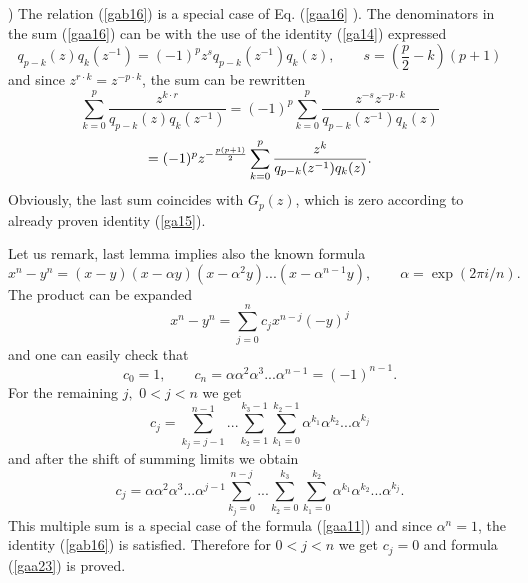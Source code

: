 \documentclass[a4paper,a4paper]{article}
\begin{document}
) The relation (\ref{gab16}) is a special case of Eq. (\ref{gaa16}%
). The denominators in the sum (\ref{gaa16}) can be with the use of the
identity (\ref{ga14}) expressed%
\begin{equation*}
q_{p-k}(z)q_{k}(z^{-1})=(-1)^{p}z^{s}q_{p-k}(z^{-1})q_{k}(z),\qquad s=\left( 
\frac{p}{2}-k\right) (p+1)
\end{equation*}%
and since $z^{r\cdot k}=z^{-p\cdot k}$, the sum can be rewritten%
\begin{equation*}
\sum_{k=0}^{p}\frac{z^{k\cdot r}}{q_{p-k}(z)q_{k}(z^{-1})}%
=(-1)^{p}\sum_{k=0}^{p}\frac{z^{-s}z^{-p\cdot k}}{q_{p-k}(z^{-1})q_{k}(z)}
\end{equation*}%
\begin{equation*}
=(-1)^{p}z^{-\frac{p(p+1)}{2}}\sum_{k=0}^{p}\frac{z^{k}}{%
q_{p-k}(z^{-1})q_{k}(z)}.
\end{equation*}%
Obviously, the last sum coincides with $G_{p}(z)$, which is zero according
to already proven identity (\ref{ga15}).

Let us remark, last lemma implies also the known formula 
\begin{equation}
x^{n}-y^{n}=(x-y)(x-\alpha y)(x-\alpha ^{2}y)...(x-\alpha ^{n-1}y),\qquad
\alpha =\exp (2\pi i/n).  \label{gaa23}
\end{equation}%
The product can be expanded%
\begin{equation*}
x^{n}-y^{n}=\sum_{j=0}^{n}c_{j}x^{n-j}(-y)^{j}
\end{equation*}%
and one can easily check that%
\begin{equation*}
c_{0}=1,\qquad c_{n}=\alpha \alpha ^{2}\alpha ^{3}...\alpha
^{n-1}=(-1)^{n-1}.
\end{equation*}%
For the remaining $j,$ $0<j<n$ we get%
\begin{equation*}
c_{j}=\sum_{k_{j}=j-1}^{n-1}...\sum_{k_{2}=1}^{k_{3}-1}%
\sum_{k_{1}=0}^{k_{2}-1}\alpha ^{k_{1}}\alpha ^{k_{2}}...\alpha ^{k_{j}}
\end{equation*}%
and after the shift of summing limits we obtain%
\begin{equation*}
c_{j}=\alpha \alpha ^{2}\alpha ^{3}...\alpha
^{j-1}\sum_{k_{j}=0}^{n-j}...\sum_{k_{2}=0}^{k_{3}}\sum_{k_{1}=0}^{k_{2}}%
\alpha ^{k_{1}}\alpha ^{k_{2}}...\alpha ^{k_{j}}.
\end{equation*}%
This multiple sum is a special case of the formula (\ref{gaa11}) and since $%
\alpha ^{n}=1$, the identity (\ref{gab16}) is satisfied. Therefore for $0<j<n
$ we get $c_{j}=0$ and formula (\ref{gaa23}) is proved.
\end{document}
